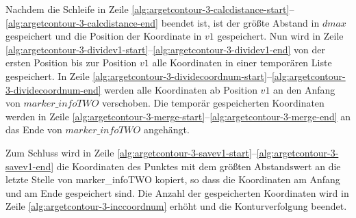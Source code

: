 Nachdem die Schleife in Zeile \ref{alg:argetcontour-3-calcdistance-start}--\ref{alg:argetcontour-3-calcdistance-end}
 beendet ist, ist der größte Abstand in $\mathit{dmax}$ gespeichert und die Position der Koordinate in $\mathit{v1}$
 gespeichert. Nun wird in Zeile \ref{alg:argetcontour-3-dividev1-start}--\ref{alg:argetcontour-3-dividev1-end} von der
 ersten Position bis zur Position $\mathit{v1}$ alle Koordinaten in einer temporären Liste gespeichert. In Zeile
 \ref{alg:argetcontour-3-dividecoordnum-start}--\ref{alg:argetcontour-3-dividecoordnum-end} werden alle Koordinaten ab
 Position $\mathit{v1}$ an den Anfang von $\mathit{marker\_infoTWO}$ verschoben. Die temporär gespeicherten Koordinaten
 werden in Zeile \ref{alg:argetcontour-3-merge-start}--\ref{alg:argetcontour-3-merge-end} an das Ende von
 $\mathit{marker\_infoTWO}$ angehängt.

Zum Schluss wird in Zeile \ref{alg:argetcontour-3-savev1-start}--\ref{alg:argetcontour-3-savev1-end} die Koordinaten
 des Punktes mit dem größten Abstandswert an die letzte Stelle von marker\_infoTWO kopiert, so dass die Koordinaten am
 Anfang und am Ende gespeichert sind. Die Anzahl der gespeicherten Koordinaten wird in Zeile
 \ref{alg:argetcontour-3-inccoordnum} erhöht und die Konturverfolgung beendet.

